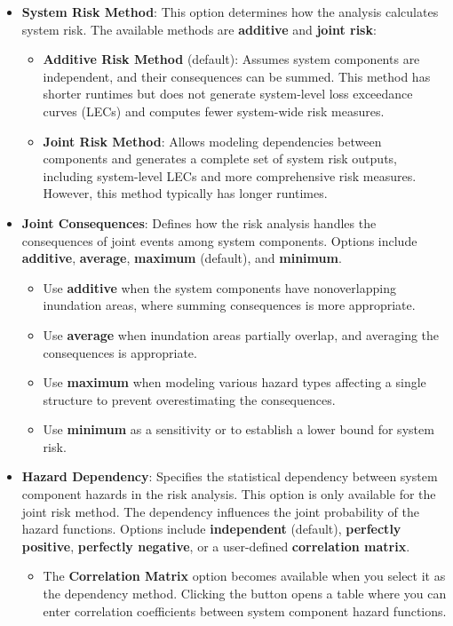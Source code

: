\documentclass[
]{book}
\providecommand{\tightlist}{%
  \setlength{\itemsep}{0pt}\setlength{\parskip}{0pt}}
\begin{document}
\begin{itemize}
\item
  \textbf{System Risk Method}: This option determines how the analysis calculates system risk. The available methods are \textbf{additive} and \textbf{joint risk}:

  \begin{itemize}
  \item
    \textbf{Additive Risk Method} (default): Assumes system components are independent, and their consequences can be summed. This method has shorter runtimes but does not generate system-level loss exceedance curves (LECs) and computes fewer system-wide risk measures.
  \item
    \textbf{Joint Risk Method}: Allows modeling dependencies between components and generates a complete set of system risk outputs, including system-level LECs and more comprehensive risk measures. However, this method typically has longer runtimes.
  \end{itemize}
\item
  \textbf{Joint Consequences}: Defines how the risk analysis handles the consequences of joint events among system components. Options include \textbf{additive}, \textbf{average}, \textbf{maximum} (default), and \textbf{minimum}.

  \begin{itemize}
  \item
    Use \textbf{additive} when the system components have nonoverlapping inundation areas, where summing consequences is more appropriate.
  \item
    Use \textbf{average} when inundation areas partially overlap, and averaging the consequences is appropriate.
  \item
    Use \textbf{maximum} when modeling various hazard types affecting a single structure to prevent overestimating the consequences.
  \item
    Use \textbf{minimum} as a sensitivity or to establish a lower bound for system risk.
  \end{itemize}
\item
  \textbf{Hazard Dependency}: Specifies the statistical dependency between system component hazards in the risk analysis. This option is only available for the joint risk method. The dependency influences the joint probability of the hazard functions. Options include \textbf{independent} (default), \textbf{perfectly positive}, \textbf{perfectly negative}, or a user-defined \textbf{correlation matrix}.

  \begin{itemize}
  \tightlist
  \item
    The \textbf{Correlation Matrix} option becomes available when you select it as the dependency method. Clicking the button opens a table where you can enter correlation coefficients between system component hazard functions.
  \end{itemize}
\end{itemize}
\end{document}
